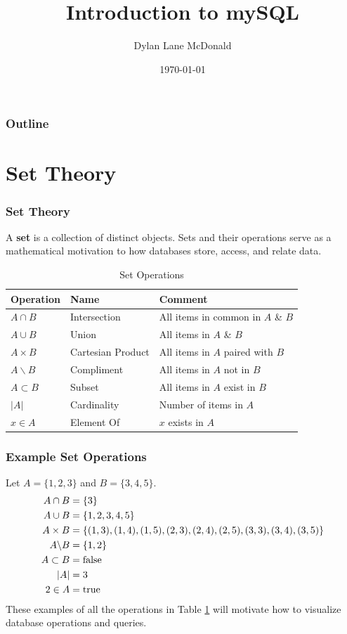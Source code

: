 \documentclass[aspectratio=169]{beamer}
\title{Introduction to mySQL}
\author{Dylan Lane McDonald}
\institute{CNM STEMulus Center\\Web Development with PHP}
\date{\today}
\begin{document}
\lstset{language=Java}
\begin{frame}
\titlepage
\end{frame}

\begin{frame}
\frametitle{Outline}
\tableofcontents
\end{frame}

\section{Set Theory}
\begin{frame}
\frametitle{Set Theory}
A \textbf{set} is a collection of distinct objects. Sets and their operations serve as a mathematical motivation to how databases store, access, and relate data.
\begin{table}
\begin{tabular}{|l|l|l|}
\hline
\textbf{Operation} & \textbf{Name} & \textbf{Comment}\\
\hline
$A \cap B$ & Intersection & All items in common in $A$ \& $B$\\
\hline
$A \cup B$ & Union & All items in $A$ \& $B$\\
\hline
$A \times B$ & Cartesian Product & All items in $A$ paired with $B$\\
\hline
$A \backslash B$ & Compliment & All items in $A$ not in $B$\\
\hline
$A \subset B$ & Subset & All items in $A$ exist in $B$\\
\hline
$\left| A \right|$ & Cardinality & Number of items in $A$\\
\hline
$x \in A$ & Element Of & $x$ exists in $A$\\
\hline
\end{tabular}
\caption{Set Operations}
\label{tbl:setoperations}
\end{table}
\end{frame}

\begin{frame}
\frametitle{Example Set Operations}
Let $A = \{1, 2, 3\}$ and $B = \{3, 4, 5\}$.
\begin{align*}
A \cap B &= \{3\}\\
A \cup B &= \{1, 2, 3, 4, 5 \}\\
A \times B &= \{(1, 3), (1, 4), (1, 5), (2, 3), (2, 4), (2, 5), (3, 3), (3, 4), (3, 5)\}\\
A \backslash B &= \{1, 2\}\\
A \subset B &= \textnormal{false}\\
\left| A \right| &= 3\\
2 \in A &= \textnormal{true}
\end{align*}
These examples of all the operations in Table \ref{tbl:setoperations} will motivate how to visualize database operations and queries.
\end{frame}
\end{document}
